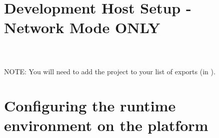 \pagebreak
\section{Development Host Setup - Network Mode ONLY}


%
\\\\NOTE: You will need to add the  project to your list of exports (in ).

\pagebreak
\section{Configuring the runtime environment on the platform}

